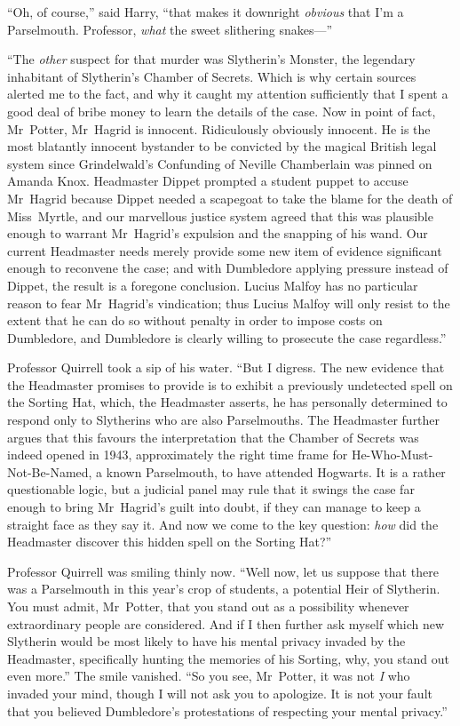 “Oh, of course,” said Harry, “that makes it downright \emph{obvious} that I’m a Parselmouth. Professor, \emph{what} the sweet slithering snakes—”

“The \emph{other} suspect for that murder was Slytherin’s Monster, the legendary inhabitant of Slytherin’s Chamber of Secrets. Which is why certain sources alerted me to the fact, and why it caught my attention sufficiently that I spent a good deal of bribe money to learn the details of the case. Now in point of fact, Mr~Potter, Mr~Hagrid is innocent. Ridiculously obviously innocent. He is the most blatantly innocent bystander to be convicted by the magical British legal system since Grindelwald’s Confunding of Neville Chamberlain was pinned on Amanda Knox. Headmaster Dippet prompted a student puppet to accuse Mr~Hagrid because Dippet needed a scapegoat to take the blame for the death of Miss~Myrtle, and our marvellous justice system agreed that this was plausible enough to warrant Mr~Hagrid’s expulsion and the snapping of his wand. Our current Headmaster needs merely provide some new item of evidence significant enough to reconvene the case; and with Dumbledore applying pressure instead of Dippet, the result is a foregone conclusion. Lucius Malfoy has no particular reason to fear Mr~Hagrid’s vindication; thus Lucius Malfoy will only resist to the extent that he can do so without penalty in order to impose costs on Dumbledore, and Dumbledore is clearly willing to prosecute the case regardless.”

Professor Quirrell took a sip of his water. “But I digress. The new evidence that the Headmaster promises to provide is to exhibit a previously undetected spell on the Sorting Hat, which, the Headmaster asserts, he has personally determined to respond only to Slytherins who are also Parselmouths. The Headmaster further argues that this favours the interpretation that the Chamber of Secrets was indeed opened in 1943, approximately the right time frame for He-Who-Must-Not-Be-Named, a known Parselmouth, to have attended Hogwarts. It is a rather questionable logic, but a judicial panel may rule that it swings the case far enough to bring Mr~Hagrid’s guilt into doubt, if they can manage to keep a straight face as they say it. And now we come to the key question: \emph{how} did the Headmaster discover this hidden spell on the Sorting Hat?”

Professor Quirrell was smiling thinly now. “Well now, let us suppose that there was a Parselmouth in this year’s crop of students, a potential Heir of Slytherin. You must admit, Mr~Potter, that you stand out as a possibility whenever extraordinary people are considered. And if I then further ask myself which new Slytherin would be most likely to have his mental privacy invaded by the Headmaster, specifically hunting the memories of his Sorting, why, you stand out even more.” The smile vanished. “So you see, Mr~Potter, it was not \emph{I} who invaded your mind, though I will not ask you to apologize. It is not your fault that you believed Dumbledore’s protestations of respecting your mental privacy.”

